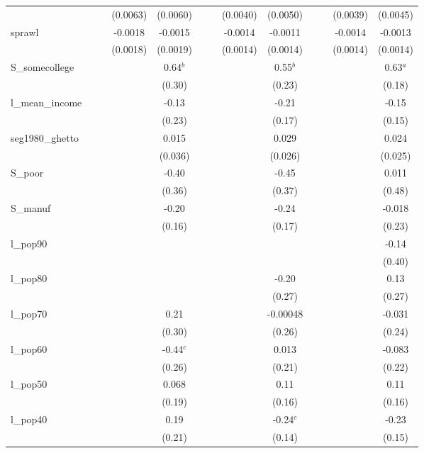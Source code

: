 \documentclass[]{article}
\begin{document}
\begin{tabular}{lcccccccccccc}
 &  &  & (0.0063) & (0.0060) &  &  & (0.0040) & (0.0050) &  &  & (0.0039) & (0.0045) \\
sprawl &  &  & -0.0018 & -0.0015 &  &  & -0.0014 & -0.0011 &  &  & -0.0014 & -0.0013 \\
 &  &  & (0.0018) & (0.0019) &  &  & (0.0014) & (0.0014) &  &  & (0.0014) & (0.0014) \\
S\_somecollege &  &  &  & 0.64$^b$ &  &  &  & 0.55$^b$ &  &  &  & 0.63$^a$ \\
 &  &  &  & (0.30) &  &  &  & (0.23) &  &  &  & (0.18) \\
l\_mean\_income &  &  &  & -0.13 &  &  &  & -0.21 &  &  &  & -0.15 \\
 &  &  &  & (0.23) &  &  &  & (0.17) &  &  &  & (0.15) \\
seg1980\_ghetto &  &  &  & 0.015 &  &  &  & 0.029 &  &  &  & 0.024 \\
 &  &  &  & (0.036) &  &  &  & (0.026) &  &  &  & (0.025) \\
S\_poor &  &  &  & -0.40 &  &  &  & -0.45 &  &  &  & 0.011 \\
 &  &  &  & (0.36) &  &  &  & (0.37) &  &  &  & (0.48) \\
S\_manuf &  &  &  & -0.20 &  &  &  & -0.24 &  &  &  & -0.018 \\
 &  &  &  & (0.16) &  &  &  & (0.17) &  &  &  & (0.23) \\
l\_pop90 &  &  &  &  &  &  &  &  &  &  &  & -0.14 \\
 &  &  &  &  &  &  &  &  &  &  &  & (0.40) \\
l\_pop80 &  &  &  &  &  &  &  & -0.20 &  &  &  & 0.13 \\
 &  &  &  &  &  &  &  & (0.27) &  &  &  & (0.27) \\
l\_pop70 &  &  &  & 0.21 &  &  &  & -0.00048 &  &  &  & -0.031 \\
 &  &  &  & (0.30) &  &  &  & (0.26) &  &  &  & (0.24) \\
l\_pop60 &  &  &  & -0.44$^c$ &  &  &  & 0.013 &  &  &  & -0.083 \\
 &  &  &  & (0.26) &  &  &  & (0.21) &  &  &  & (0.22) \\
l\_pop50 &  &  &  & 0.068 &  &  &  & 0.11 &  &  &  & 0.11 \\
 &  &  &  & (0.19) &  &  &  & (0.16) &  &  &  & (0.16) \\
l\_pop40 &  &  &  & 0.19 &  &  &  & -0.24$^c$ &  &  &  & -0.23 \\
 &  &  &  & (0.21) &  &  &  & (0.14) &  &  &  & (0.15) \\

\end{tabular}
\end{document}
